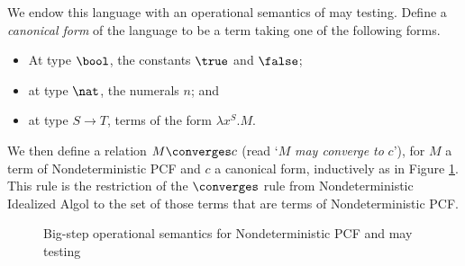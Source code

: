 We endow this language with an operational semantics of may testing.  
Define a \emph{canonical form} of the language to be a term taking one of the following forms.
\begin{itemize}
  \item At type $\bool$, the constants $\true$ and $\false$;
  \item at type $\nat$, the numerals $n$; and
  \item at type $S \to T$, terms of the form $\lambda x^S.M$.
\end{itemize}
We then define a relation $M \converges c$ (read `$M$ \emph{may converge to} $c$'), for $M$ a term of Nondeterministic PCF and $c$ a canonical form, inductively as in Figure \ref{FigNDPCFOpSem}.
This rule is the restriction of the $\converges$ rule from Nondeterministic Idealized Algol to the set of those terms that are terms of Nondeterministic PCF.
\begin{figure}
  \caption{Big-step operational semantics for Nondeterministic PCF and may testing}
  \label{FigNDPCFOpSem}
\end{figure}

